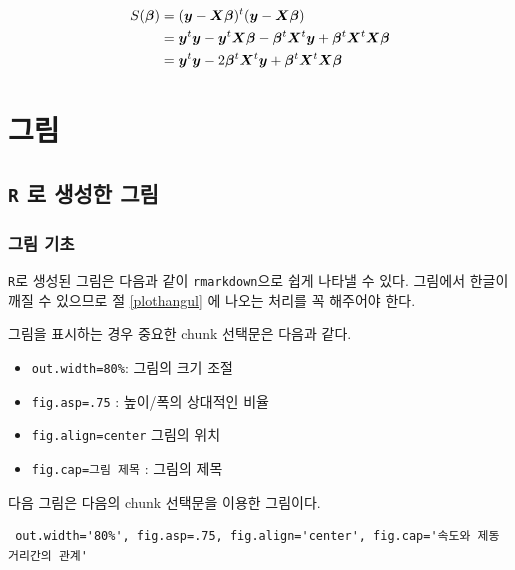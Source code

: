 \documentclass[
]{book}
\providecommand{\tightlist}{%
  \setlength{\itemsep}{0pt}\setlength{\parskip}{0pt}}
\theoremstyle{definition}
\theoremstyle{definition}
\theoremstyle{definition}
\theoremstyle{definition}
\theoremstyle{remark}
\begin{document}
\begin{align} 
S( \bm \beta ) & =  ( \bm y -  \bm X \bm \beta)^t( \bm y -  \bm X \bm \beta ) \notag \\
  & = \bm y^t \bm y - \bm y^t \bm X \bm \beta - \bm \beta^t \bm X^t \bm y
    + \bm \beta^t \bm X^t \bm X \bm \beta \notag \\
  & = \bm y^t \bm y -2  \bm \beta^t \bm X^t \bm y
    + \bm \beta^t \bm X^t \bm X \bm \beta \label{eq:rsq3}  
\end{align}

\hypertarget{figure}{%
\chapter{그림}\label{figure}}

\hypertarget{r-uxb85c-uxc0dduxc131uxd55c-uxadf8uxb9bc}{%
\section{\texorpdfstring{\texttt{R} 로 생성한 그림}{R 로 생성한 그림}}\label{r-uxb85c-uxc0dduxc131uxd55c-uxadf8uxb9bc}}

\hypertarget{uxadf8uxb9bc-uxae30uxcd08}{%
\subsection{그림 기초}\label{uxadf8uxb9bc-uxae30uxcd08}}

\texttt{R}로 생성된 그림은 다음과 같이 \texttt{rmarkdown}으로 쉽게 나타낼 수 있다. 그림에서 한글이 깨질 수 있으므로 절 \ref{plothangul} 에 나오는 처리를 꼭 해주어야 한다.

그림을 표시하는 경우 중요한 chunk 선택문은 다음과 같다.

\begin{itemize}
\tightlist
\item
  \texttt{out.width=\textquotesingle{}80\%\textquotesingle{}}: 그림의 크기 조절
\item
  \texttt{fig.asp=.75} : 높이/폭의 상대적인 비율
\item
  \texttt{fig.align=\textquotesingle{}center\textquotesingle{}} 그림의 위치
\item
  \texttt{fig.cap=\textquotesingle{}그림\ 제목\textquotesingle{}} : 그림의 제목
\end{itemize}

다음 그림은 다음의 chunk 선택문을 이용한 그림이다.

\begin{verbatim}
 out.width='80%', fig.asp=.75, fig.align='center', fig.cap='속도와 제동 거리간의 관계'
\end{verbatim}
\end{document}
